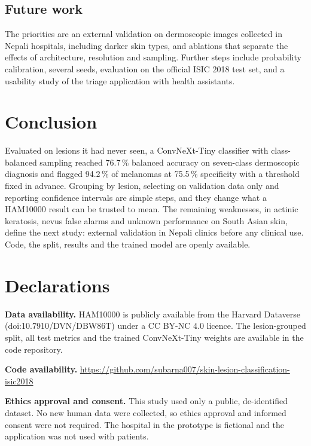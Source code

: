 \documentclass[11pt,a4paper]{article}
\newcommand{\pct}{\,\%}
\begin{document}
\subsection{Future work}
The priorities are an external validation on dermoscopic images collected in Nepali hospitals, including darker skin types, and ablations that separate the effects of architecture, resolution and sampling. Further steps include probability calibration, several seeds, evaluation on the official ISIC 2018 test set, and a usability study of the triage application with health assistants.

\section{Conclusion}
Evaluated on lesions it had never seen, a ConvNeXt-Tiny classifier with class-balanced sampling reached 76.7\pct{} balanced accuracy on seven-class dermoscopic diagnosis and flagged 94.2\pct{} of melanomas at 75.5\pct{} specificity with a threshold fixed in advance. Grouping by lesion, selecting on validation data only and reporting confidence intervals are simple steps, and they change what a HAM10000 result can be trusted to mean. The remaining weaknesses, in actinic keratosis, nevus false alarms and unknown performance on South Asian skin, define the next study: external validation in Nepali clinics before any clinical use. Code, the split, results and the trained model are openly available.

\section*{Declarations}
\small\sloppy
\textbf{Data availability.} HAM10000 is publicly available from the Harvard Dataverse (doi:10.7910/DVN/DBW86T) under a CC BY-NC 4.0 licence. The lesion-grouped split, all test metrics and the trained ConvNeXt-Tiny weights are available in the code repository.

\textbf{Code availability.} \url{https://github.com/subarna007/skin-lesion-classification-isic2018}

\textbf{Ethics approval and consent.} This study used only a public, de-identified dataset. No new human data were collected, so ethics approval and informed consent were not required. The hospital in the prototype is fictional and the application was not used with patients.
\end{document}
